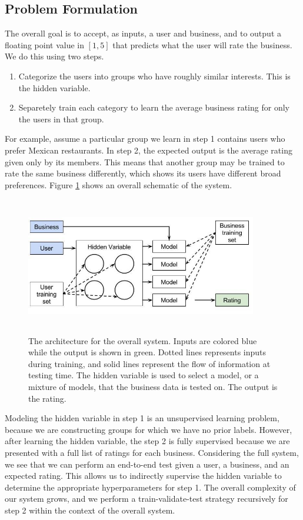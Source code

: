 \documentclass[11pt]{article}
\begin{document}
\subsection{Problem Formulation}
The overall goal is to accept, as inputs, a user and business, and to output a floating point value in $[1, 5]$ that predicts what the user will rate the business. We do this using two steps.

\begin{enumerate}
\item Categorize the users into groups who have roughly similar interests. This is the hidden variable.
\item Separetely train each category to learn the average business rating for only the users in that group.
\end{enumerate}

For example, assume a particular group we learn in step 1 contains users who prefer Mexican restaurants. In step 2, the expected output is the average rating given only by its members. This means that another group may be trained to rate the same business differently, which shows its users have different broad preferences. Figure \ref{fig:system} shows an overall schematic of the system.\\

\begin{figure}[h!]
    \centering
    \includegraphics[width=0.9\textwidth, height=6cm]{system}
    \caption{The architecture for the overall system. Inputs are colored blue while the output is shown in green. Dotted lines represents inputs during training, and solid lines represent the flow of information at testing time. The hidden variable is used to select a model, or a mixture of models, that the business data is tested on. The output is the rating.}
    \label{fig:system}
\end{figure} 

Modeling the hidden variable in step 1 is an unsupervised learning problem, because we are constructing groups for which we have no prior labels. However, after learning the hidden variable, the step 2 is fully supervised because we are presented with a full list of ratings for each business. Considering the full system, we see that we can perform an end-to-end test given a user, a business, and an expected rating. This allows us to indirectly supervise the hidden variable to determine the appropriate hyperparameters for step 1. The overall complexity of our system grows, and we perform a train-validate-test strategy recursively for step 2 within the context of the overall system.
\end{document}
